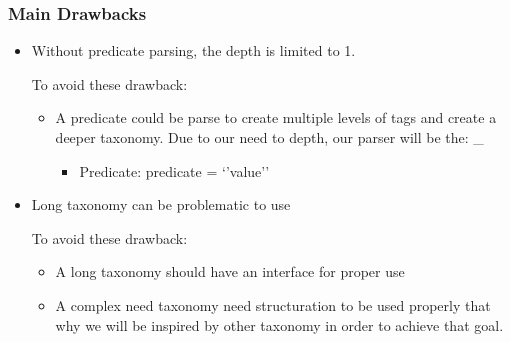 \documentclass[12pt]{report}
\begin{document}
\subsubsection*{Main Drawbacks }
\begin{itemize}
	\item	Without predicate parsing, the depth is limited to 1.\par

To avoid these drawback:\par

\begin{itemize}
	\item	A predicate could be parse to create multiple levels of tags and create a deeper taxonomy. Due to our need to depth, our parser will be the: \‘\’\_ \‘\’  \par

\begin{itemize}
	\item  Predicate: predicate = ‘’value’’  \par

\end{itemize}
\end{itemize}
	\item Long taxonomy can be problematic to use\par


\vspace{\baselineskip}
To avoid these drawback: \par

\begin{itemize}
	\item	A long taxonomy should have an interface for proper use\par

	\item	A complex need taxonomy need structuration to be used properly that why we will be inspired by other taxonomy in order to achieve that goal.
\end{itemize}
\end{itemize}\par

\newpage
\end{document}
